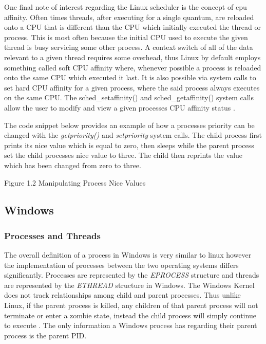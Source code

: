       \normalfont \indent One final note of interest regarding the Linux scheduler is the concept of cpu affinity. Often times threads, after executing for a single quantum, are reloaded onto a CPU that is different than the CPU which initially executed the thread or process. This is most often because the initial CPU used to execute the given thread is busy servicing some other process. A context switch of all of the data relevant to a given thread requires some overhead, thus Linux by default employs something called soft CPU affinity where, whenever possible a process is reloaded onto the same CPU which executed it last. It is also possible via system calls to set hard CPU affinity for a given process, where the said process always executes on the same CPU. The sched\_setaffinity() and sched\_getaffinity() system calls allow the user to modify and view a given processes CPU affinity status \cite{linuxProgInterface}.

	\normalfont \indent The code snippet below provides an example of how a processes priority can be changed with the \textit{getpriority()} and \textit{setpriority} system calls. The child process first prints its nice value which is equal to zero, then sleeps while the parent process set the child processes nice value to three. The child then reprints the value which has been changed from zero to three. 
\newpage

	 
\begin{center}
Figure 1.2 Manipulating Process Nice Values
\end{center}

\subsection{\bf Windows}

  \subsubsection{\bf Processes and Threads}
  \normalfont \indent The overall definition of a process in Windows is very similar to linux however the implementation of processes between the two operating systems differs significantly. Processes are represented by the \textit{EPROCESS} structure and threads are represented by the \textit{ETHREAD} structure in Windows. The Windows Kernel does not track relationships among child and parent processes. Thus unlike Linux, if the parent process is killed, any children of that parent process will not terminate or enter a zombie state, instead the child process will simply continue to execute \cite{windowsInternals}. The only information a Windows process has regarding their parent process is the parent PID.


